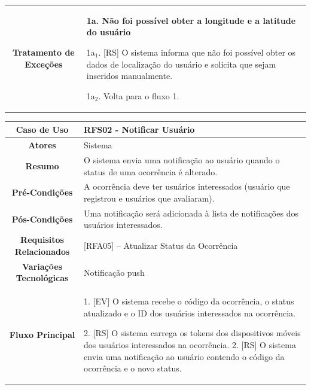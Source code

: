 \begin{apendicesenv}
\begin{quadro}[htb]
\begin{tabular}{|c|p{11cm}|}
		\textbf{Tratamento de Exceções} &
		\parbox[t]{11cm}{
			\raggedright
			\textbf{1a. Não foi possível obter a longitude e a latitude do usuário}\par
			1a$_1$. [RS] O sistema informa que não foi possível obter os dados de localização do usuário e solicita que sejam inseridos manualmente.\par
			1a$_2$. Volta para o fluxo 1.
		}
		\\ \hline
	\end{tabular}
	
\end{quadro}

\begin{quadro}[htb]
	\centering
	\caption{\label{quadro_rfs02}Caso de Uso Notificar Usuário (Baixo Nível)}
	\small
	\renewcommand{\arraystretch}{1.1}
	
	\begin{tabular}{|c|p{11cm}|}
		\hline
		\textbf{Caso de Uso} & RFS02 - Notificar Usuário \\ \hline
		\textbf{Atores} & Sistema \\ \hline
		\textbf{Resumo} & O sistema envia uma notificação ao usuário quando o status de uma ocorrência é alterado. \\ \hline
		\textbf{Pré-Condições} & A ocorrência deve ter usuários interessados (usuário que registrou e usuários que avaliaram). \\ \hline
		\textbf{Pós-Condições} & Uma notificação será adicionada à lista de notificações dos usuários interessados. \\ \hline
		\textbf{Requisitos Relacionados} & [RFA05] -- Atualizar Status da Ocorrência \\ \hline
		\textbf{Variações Tecnológicas} & Notificação push \\ \hline
		
		\textbf{Fluxo Principal} &
		\parbox[t]{11cm}{
			\raggedright
			1. [EV] O sistema recebe o código da ocorrência, o status atualizado e o ID dos usuários interessados na ocorrência.\par
			2. [RS] O sistema carrega os tokens dos dispositivos móveis dos usuários interessados na ocorrência. 
			2. [RS] O sistema envia uma notificação ao usuário contendo o código da ocorrência e o novo status.
		}
		\\ \hline
		
		\textbf{Tratamento de Exceções} &
		\parbox[t]{11cm}{
			\raggedright
			--
		}
		\\ \hline
	\end{tabular}
	

\end{quadro}
\end{apendicesenv}
